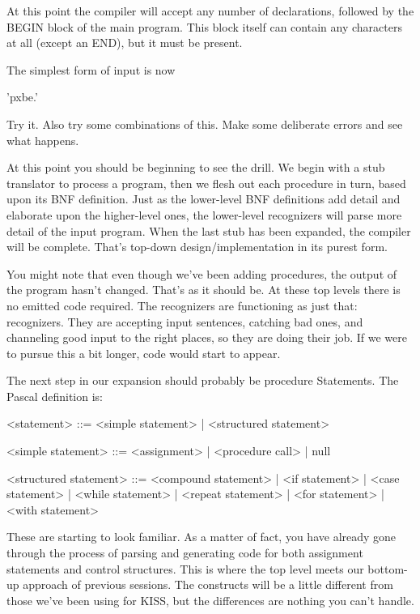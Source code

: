 \documentclass[float=false, crop=false]{standalone}
\begin{document}
At this point the compiler will accept any number of declarations, followed by
the BEGIN block of the main program. This block itself can contain any
characters at all (except an END), but it must be present.

The simplest form of input is now

     'pxbe.'

Try it. Also try some combinations of this. Make some deliberate errors and see
what happens.

At this point you should be beginning to see the drill. We begin with a stub
translator to process a program, then we flesh out each procedure in turn, based
upon its BNF definition. Just as the lower-level BNF definitions add detail and
elaborate upon the higher-level ones, the lower-level recognizers will parse
more detail of the input program. When the last stub has been expanded, the
compiler will be complete. That's top-down design/implementation in its purest
form.

You might note that even though we've been adding procedures, the output of the
program hasn't changed. That's as it should be. At these top levels there is no
emitted code required. The recognizers are functioning as just that:
recognizers. They are accepting input sentences, catching bad ones, and
channeling good input to the right places, so they are doing their job. If we
were to pursue this a bit longer, code would start to appear.

The next step in our expansion should probably be procedure Statements. The
Pascal definition is:


    <statement> ::= <simple statement> | <structured statement>

    <simple statement> ::= <assignment> | <procedure call> | null

    <structured statement> ::= <compound statement> |
                               <if statement>       |
                               <case statement>     |
                               <while statement>    |
                               <repeat statement>   |
                               <for statement>      |
                               <with statement>


These are starting to look familiar. As a matter of fact, you have already gone
through the process of parsing and generating code for both assignment
statements and control structures. This is where the top level meets our
bottom-up approach of previous sessions. The constructs will be a little
different from those we've been using for KISS, but the differences are nothing
you can't handle.
\end{document}
